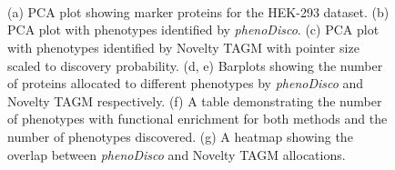 \documentclass[12pt,english]{article}
\begin{document}
\begin{figure}
	\begin{subfigure}[t]{0.33\textwidth}
		\centering
		\caption{}
	\end{subfigure}%
	\begin{subfigure}[t]{0.33\textwidth}
		\centering
		\caption{}
	\end{subfigure}%
	\begin{subfigure}[t]{0.33\textwidth}
		\centering
		\caption{}
	\end{subfigure}
~
	\begin{subfigure}[t]{0.5\textwidth}
		\centering
		\caption{}
	\end{subfigure}
	\begin{subfigure}[t]{0.5\textwidth}
		\centering
		\caption{}
	\end{subfigure}	
~
\begin{subfigure}{0.5\textwidth}
			\caption{}
\end{subfigure}
	\begin{subfigure}[t]{0.5\textwidth}
	\centering
	\caption{}
\end{subfigure}
~
	\caption{(a) PCA plot showing marker proteins for the HEK-293 dataset. (b) PCA plot with phenotypes identified by \textit{phenoDisco}. (c) PCA plot with phenotypes identified by Novelty TAGM with pointer size scaled to discovery probability. (d, e) Barplots showing the number of proteins allocated to different phenotypes by \textit{phenoDisco} and Novelty TAGM respectively. (f) A table demonstrating the number of phenotypes with functional enrichment for both methods and the number of phenotypes discovered. (g) A heatmap showing the overlap between \textit{phenoDisco} and Novelty TAGM allocations.
	}
	\label{figure:phenodisco}
\end{figure}
\clearpage
\end{document}
